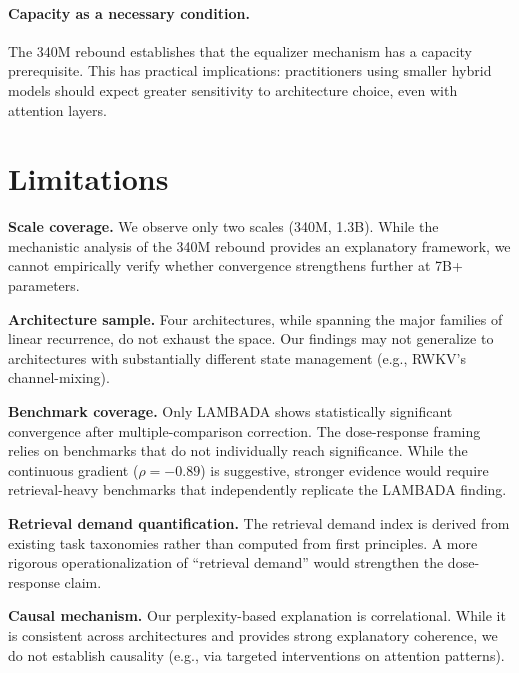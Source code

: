 \documentclass[11pt,a4paper]{article}
\begin{document}
\paragraph{Capacity as a necessary condition.}
The 340M rebound establishes that the equalizer mechanism has a capacity prerequisite.
This has practical implications: practitioners using smaller hybrid models should expect greater sensitivity to architecture choice, even with attention layers.


\section{Limitations}

\textbf{Scale coverage.}
We observe only two scales (340M, 1.3B).
While the mechanistic analysis of the 340M rebound provides an explanatory framework, we cannot empirically verify whether convergence strengthens further at 7B+ parameters.

\textbf{Architecture sample.}
Four architectures, while spanning the major families of linear recurrence, do not exhaust the space.
Our findings may not generalize to architectures with substantially different state management (e.g., RWKV's channel-mixing).

\textbf{Benchmark coverage.}
Only LAMBADA shows statistically significant convergence after multiple-comparison correction.
The dose-response framing relies on benchmarks that do not individually reach significance.
While the continuous gradient ($\rho{=}{-}0.89$) is suggestive, stronger evidence would require retrieval-heavy benchmarks that independently replicate the LAMBADA finding.

\textbf{Retrieval demand quantification.}
The retrieval demand index is derived from existing task taxonomies rather than computed from first principles.
A more rigorous operationalization of ``retrieval demand'' would strengthen the dose-response claim.

\textbf{Causal mechanism.}
Our perplexity-based explanation is correlational.
While it is consistent across architectures and provides strong explanatory coherence, we do not establish causality (e.g., via targeted interventions on attention patterns).


\end{document}
